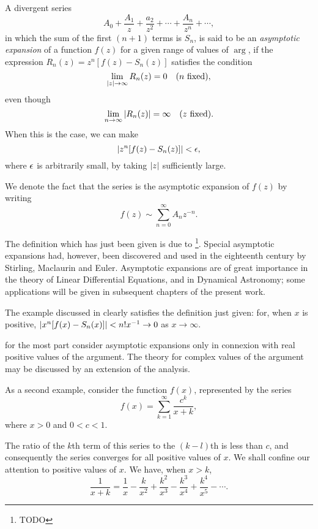  A divergent series
$$
A_{0} + \frac{A_{1}}{z} + \frac{a_{2}}{z^{2}} + \cdots +
\frac{A_{n}}{z^{n}} + \cdots,
$$
in which the sum of the first $(n + 1)$ terms is $S_{n}$, is said to
be an \emph{asymptotic expansion} of a function $f(z)$ for a given
range of values of $\arg$, if the expression $R_{n}(z) = z^{n}[f(z) -
S_{n}(z)]$ satisfies the condition
$$
\lim_{ \left| z \right| \rightarrow \infty } R_{n}(z) = 0 \quad (\textrm{$n$
fixed}),
$$
even though
$$
\lim_{n \rightarrow \infty} \left| R_{n}(z) \right| = \infty \quad
(\textrm{$z$ fixed}).
$$
When this is the case, we can make
$$
\left|  z^{n} [f(z) - S_{n}(z)]  \right| < \epsilon,
$$
where $\epsilon$ is arbitrarily small, by taking $\left| z \right|$ sufficiently
large.

We denote the fact that the series is the asymptotic expansion of
$f(z)$ by writing
$$
f(z) \sim \sum_{n=0}^{\infty} A_{n} z^{-n}.
$$

The definition which has just been given is due to
\Poincare\footnote{TODO}. Special asymptotic expansions had, however,
been discovered and used in the eighteenth century by Stirling,
Maclaurin and Euler. Asymptotic expansions are of great importance in
the theory of Linear Differential Equations, and in Dynamical
Astronomy; some applications will be given in subsequent chapters of
the present work.

The example discussed in  clearly satisfies the
definition just given: for, when $x$ is positive, $\left| x^{n} [f(x)
- S_{n}(x)] \right| < n! x^{-1} \rightarrow 0$ as $x \rightarrow \infty$.

for the most part consider asymptotic expansions only in connexion
with real positive values of the argument. The theory for complex
values of the argument may be discussed by an extension of the
analysis.

 As a second
example, consider the function $f(x)$, represented by the series
$$
f(x) = \sum_{k=1}^{\infty} \frac{c^{k}}{x+k},
$$
where $x > 0$ and $0 < c < 1$.

% 
%

The ratio of the $k$th term of this series to the $(k- l)$th is less
than $c$, and consequently the series converges for all positive
values of $x$. We shall confine our attention to positive values of
$x$. We have, when $x > k$,
$$
\frac{1}{x+k} = \frac{1}{x} - \frac{k}{x^{2}} + \frac{k^{2}}{x^{3}} -
\frac{k^{3}}{x^{4}} + \frac{k^{4}}{x^{5}} - \cdots.
$$

